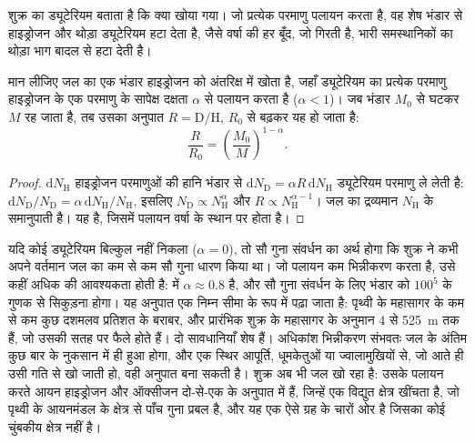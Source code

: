 शुक्र का ड्यूटेरियम बताता है कि क्या खोया गया। जो प्रत्येक परमाणु पलायन करता है,
वह शेष भंडार से हाइड्रोजन और थोड़ा ड्यूटेरियम हटा देता है, जैसे वर्षा की
हर बूँद, जो गिरती है, भारी समस्थानिकों का थोड़ा भाग
बादल से हटा देती है।

\begin{proposition}[पलायन द्वारा समस्थानिक संवर्धन]\label{prop:b3:planetary-atmospheres:dh}
मान लीजिए जल का एक भंडार हाइड्रोजन को अंतरिक्ष में खोता है, जहाँ ड्यूटेरियम का
प्रत्येक परमाणु हाइड्रोजन के एक परमाणु के सापेक्ष दक्षता $\alpha$ से पलायन करता है
($\alpha < 1$)। जब भंडार $M_0$ से घटकर $M$ रह जाता है, तब उसका अनुपात
$R = \mathrm{D}/\mathrm{H}$, $R_0$ से बढ़कर यह हो जाता है:
\[
\frac R{R_0} = \left(\frac{M_0}M\right)^{1-\alpha}.
\]
\end{proposition}

\begin{proof}
$\mathrm dN_\mathrm H$ हाइड्रोजन परमाणुओं की हानि भंडार से
$\mathrm dN_\mathrm D = \alpha R\,\mathrm dN_\mathrm H$ ड्यूटेरियम परमाणु ले लेती है:
$\mathrm dN_\mathrm D/N_\mathrm D = \alpha\,\mathrm dN_\mathrm H/
N_\mathrm H$, इसलिए $N_\mathrm D \propto N_\mathrm H^\alpha$ और $R \propto
N_\mathrm H^{\alpha - 1}$। जल का द्रव्यमान
$N_\mathrm H$ के समानुपाती है। यह  है, जिसमें पलायन
वर्षा के स्थान पर होता है।
\end{proof}

यदि कोई ड्यूटेरियम बिल्कुल नहीं निकला ($\alpha = 0$), तो सौ गुना संवर्धन का अर्थ
होगा कि शुक्र ने कभी अपने वर्तमान जल का कम से कम सौ गुना धारण किया था। जो पलायन कम
भिन्नीकरण करता है, उसे कहीं अधिक की आवश्यकता होती है:  में
$\alpha \approx 0.8$ है, और सौ गुना संवर्धन के लिए
भंडार को $100^5$ के गुणक से सिकुड़ना होगा। यह अनुपात एक निम्न सीमा के रूप में पढ़ा जाता है:
पृथ्वी के महासागर के कम से कम कुछ दशमलव प्रतिशत के बराबर,
और प्रारंभिक शुक्र के महासागर के अनुमान 4 से \qty{525}{m} तक हैं,
जो उसकी सतह पर फैले होते हैं। दो सावधानियाँ शेष हैं। अधिकांश भिन्नीकरण संभवतः
जल के अंतिम कुछ बार के नुकसान में ही हुआ होगा, और एक स्थिर
आपूर्ति, धूमकेतुओं या ज्वालामुखियों से, जो आते ही उसी गति से खो जाती हो,
वही अनुपात बना सकती है। शुक्र अब भी जल खो रहा है: उसके पलायन करते आयन
हाइड्रोजन और ऑक्सीजन दो-से-एक के अनुपात में हैं, जिन्हें एक विद्युत
क्षेत्र खींचता है, जो पृथ्वी के आयनमंडल के क्षेत्र से पाँच गुना प्रबल है,
और यह एक ऐसे ग्रह के चारों ओर है जिसका कोई चुंबकीय क्षेत्र नहीं है।

